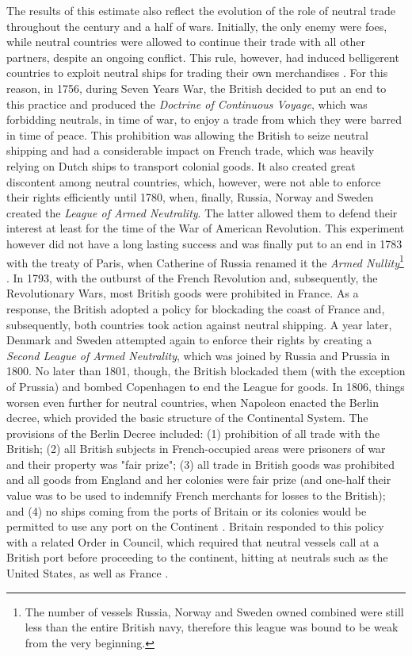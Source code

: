 \documentclass[12pt,a4paper,notitlepage,english]{article}
\begin{document}
The results of this estimate also reflect the evolution of the role of neutral trade throughout the century and a half of wars. Initially, the only enemy were foes, while neutral countries were allowed to continue their trade with all other partners, despite an ongoing conflict. This rule, however, had induced belligerent countries to exploit neutral ships for trading their own merchandises \citep{carriere1973negociants}. For this reason, in 1756, during Seven Years War, the British decided to put an end to this practice and produced the \textit{Doctrine of Continuous Voyage}, which was forbidding neutrals, in time of war, to enjoy a trade from which they were barred in time of peace. This prohibition was allowing the British to seize neutral shipping and had a considerable impact on French trade, which was heavily relying on Dutch ships to transport colonial goods. It also created great discontent among neutral countries, which, however, were not able to enforce their rights efficiently until 1780, when, finally, Russia, Norway and Sweden created the \textit{League of Armed Neutrality}. The latter allowed them to defend their interest at least for the time of the War of American Revolution. This experiment however did not have a long lasting success and was finally put to an end in 1783 with the treaty of Paris, when Catherine of Russia renamed it the \textit{Armed Nullity}\footnote{The number of vessels Russia, Norway and Sweden owned combined were still less than the entire British navy, therefore this league was bound to be weak from the very beginning.} \citep{griffiths1971american}. In 1793, with the outburst of the French Revolution and, subsequently, the Revolutionary Wars, most British goods were prohibited in France. As a response, the British adopted a policy for blockading the coast of France and, subsequently, both countries took action against neutral shipping. A year later, Denmark and Sweden attempted again to enforce their rights by creating a \textit{Second League of Armed Neutrality}, which was joined by Russia and Prussia in 1800. No later than 1801, though, the British blockaded them (with the exception of Prussia) and bombed Copenhagen to end the League for goods. In 1806, things worsen even further for neutral countries, when Napoleon enacted the Berlin decree, which provided the basic structure of the Continental System. The provisions of the Berlin Decree included: (1) prohibition of all trade with the British; (2) all British subjects in French-occupied areas were prisoners of war and their property was "fair prize"; (3) all trade in British goods was prohibited and all goods from England and her colonies were fair prize (and one-half their value was to be used to indemnify French merchants for losses to the British); and (4) no ships coming from the ports of Britain or its colonies would be permitted to use any port on the Continent \citep{davis2006naval}. Britain responded to this policy with a related Order in Council, which required that neutral vessels call at a British port before proceeding to the continent, hitting at neutrals such as the United States, as well as France \citep{davis2006naval}.
\end{document}
